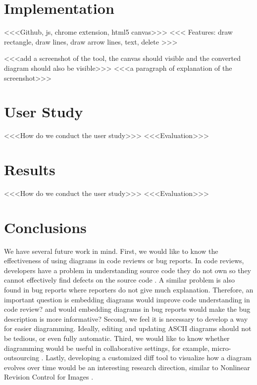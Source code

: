 \documentclass{sig-alternate}
\begin{document}
\section{Implementation}
\label{implementation}
<<<Github, js, chrome extension, html5 canvas>>>
<<< Features: draw rectangle, draw lines, draw arrow lines, text, delete >>>

<<<add a screenshot of the tool, the canvas should visible and the converted diagram should also be visible>>>
<<<a paragraph of explanation of the screenshot>>>

\section{User Study}
\label{user_study}
<<<How do we conduct the user study>>>
<<<Evaluation>>>


\section{Results}
\label{results}
<<<How do we conduct the user study>>>
<<<Evaluation>>>




\section{Conclusions}
We have several future work in mind. First, we would like to know the effectiveness of using diagrams in code reviews or bug reports. In code reviews, developers have a problem in understanding source code they do not own so they cannot effectively find defects on the source code \cite{Bacchelli2013}. A similar problem is also found in bug reports where reporters do not give much explanation. Therefore, an important question is embedding diagrams would improve code understanding in code review? and would embedding diagrams in bug reports would make the bug description is more informative? Second, we feel it is necessary to develop a way for easier diagramming. Ideally, editing and updating ASCII diagrams should not be tedious, or even fully automatic. Third, we would like to know whether diagramming would be useful in collaborative settings, for example, micro-outsourcing \cite{Goldman2011}. Lastly, developing a customized diff tool to visualize how a diagram evolves over time would be an interesting research direction, similar to Nonlinear Revision Control for Images \cite{Chen2011}.



\nocite{*}

\end{document}

